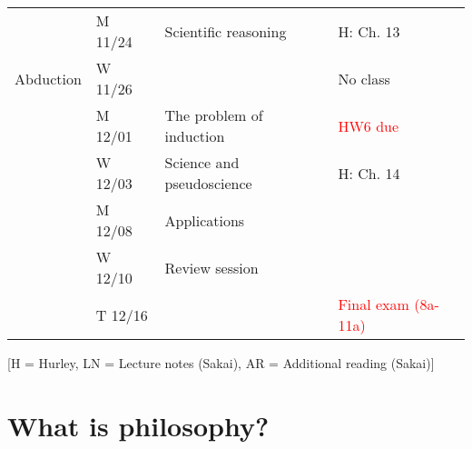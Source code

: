 \documentclass[10pt,letterpaper,xcolor=dvipsnames,handout]{beamer}
\begin{document}
\begin{frame}
\begin{tabular}{|l|l|l|l|}
\hline 
\multirow{3}{*}{Abduction}

 & M 11/24 & Scientific reasoning & H: Ch. 13 \\
 & W 11/26 & & No class \\
 & M 12/01 & The problem of induction & \textcolor{red}{HW6 due} \\
 & W 12/03 & Science and pseudoscience & H: Ch. 14 \\
 & M 12/08 & Applications & \\
 & W 12/10 & Review session & \\
 & T 12/16 & & \textcolor{red}{Final exam (8a-11a)} \\

\hline

\end{tabular}

[H = Hurley, LN = Lecture notes (Sakai), AR = Additional reading (Sakai)]

\end{frame}

\section{What is philosophy?}
\end{document}
